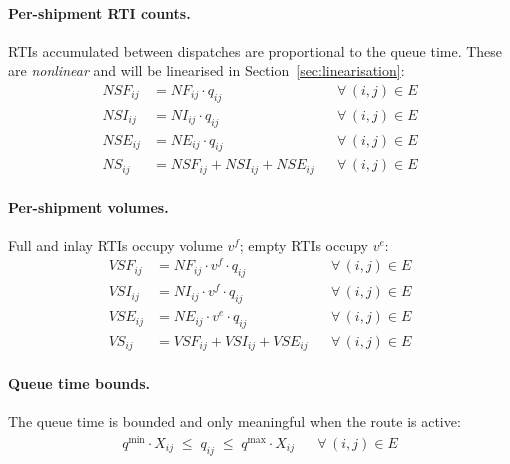 \paragraph{Per-shipment RTI counts.}
RTIs accumulated between dispatches are proportional to the queue
time. These are \emph{nonlinear} and will be linearised in
Section~\ref{sec:linearisation}:
%
\begin{align}
  NSF_{ij} &= NF_{ij} \cdot q_{ij}
  && \forall\,(i,j)\in E \label{eq:ship-NF}\\
  NSI_{ij} &= NI_{ij} \cdot q_{ij}
  && \forall\,(i,j)\in E \label{eq:ship-NI}\\
  NSE_{ij} &= NE_{ij} \cdot q_{ij}
  && \forall\,(i,j)\in E \label{eq:ship-NE}\\
  NS_{ij}  &= NSF_{ij} + NSI_{ij} + NSE_{ij}
  && \forall\,(i,j)\in E \label{eq:ship-N}
\end{align}

\paragraph{Per-shipment volumes.}
Full and inlay RTIs occupy volume $v^{f}$; empty RTIs occupy $v^{e}$:
%
\begin{align}
  VSF_{ij} &= NF_{ij} \cdot v^{f} \cdot q_{ij}
  && \forall\,(i,j)\in E \label{eq:ship-VF}\\
  VSI_{ij} &= NI_{ij} \cdot v^{f} \cdot q_{ij}
  && \forall\,(i,j)\in E \label{eq:ship-VI}\\
  VSE_{ij} &= NE_{ij} \cdot v^{e} \cdot q_{ij}
  && \forall\,(i,j)\in E \label{eq:ship-VE}\\
  VS_{ij}  &= VSF_{ij} + VSI_{ij} + VSE_{ij}
  && \forall\,(i,j)\in E \label{eq:ship-vol}
\end{align}


\paragraph{Queue time bounds.}
The queue time is bounded and only meaningful when the route is active:
%
\begin{align}
  q^{\min} \cdot X_{ij}
  \;\leq\; q_{ij}
  \;\leq\; q^{\max} \cdot X_{ij}
  && \forall\,(i,j)\in E
  \label{eq:q-bounds}
\end{align}


